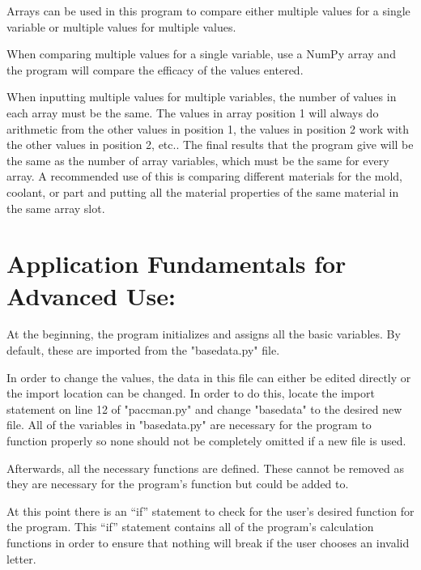 \documentclass[a4paper,12pt]{article}
\begin{document}
Arrays can be used in this program to compare either multiple values for a single variable or multiple values for multiple values.

\medskip

When comparing multiple values for a single variable, use a NumPy array and the program will compare the efficacy of the values entered.

\medskip 

When inputting multiple values for multiple variables, the number of values in each array must be the same. The values in array position 1 will always do arithmetic from the other values in position 1, the values in position 2 work with the other values in position 2, etc.. The final results that the program give will be the same as the number of array variables, which must be the same for every array. A recommended use of this is  comparing different materials for the mold, coolant, or part and putting all the material properties of the same material in the same array slot.

\clearpage

\section*{Application Fundamentals for Advanced Use:}

At the beginning, the program initializes and assigns all the basic variables. By default, these are imported from the "basedata.py" file. 

\medskip

In order to change the values, the data in this file can either be edited directly or the import location can be changed. In order to do this, locate the import statement on line 12 of "paccman.py" and change "basedata" to the desired new file. All of the variables in "basedata.py" are necessary for the program to function properly so none should not be completely omitted if a new file is used.

\medskip

Afterwards, all the necessary functions are defined. These cannot be removed as they are necessary for the program’s function but could be added to.

\medskip

At this point there is an “if” statement to check for the user’s desired function for the program.  This “if” statement contains all of the program’s calculation functions in order to ensure that nothing will break if the user chooses an invalid letter.
\end{document}
